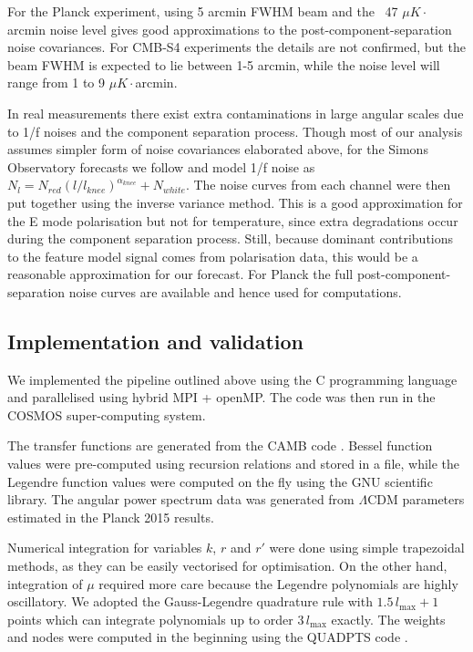 For the Planck experiment, using 5 arcmin FWHM beam and the ~47 $\mu K \cdot $arcmin noise level gives good approximations to the post-component-separation noise covariances. For CMB-S4 experiments the details are not confirmed, but the beam FWHM is expected to lie between 1-5 arcmin, while the noise level will range from 1 to 9 $\mu K \cdot $arcmin. \cite{Abazajian2016}

In real measurements there exist extra contaminations in large angular scales due to 1/f noises and the component separation process. Though most of our analysis assumes simpler form of noise covariances elaborated above, for the Simons Observatory forecasts we follow \cite{TheSimonsObservatoryCollaboration2018} and model 1/f noise as $N_l = N_{red} (l/l_{knee})^{\alpha_{knee}} + N_{white}$. The noise curves from each channel were then put together using the inverse variance method. This is a good approximation for the E mode polarisation but not for temperature, since extra degradations occur during the component separation process. Still, because dominant contributions to the feature model signal comes from polarisation data, this would be a reasonable approximation for our forecast. For Planck the full post-component-separation noise curves are available and hence used for computations. 



\subsection{Implementation and validation}

We implemented the pipeline outlined above using the C programming language and parallelised using hybrid MPI + openMP. The code was then run in the COSMOS super-computing system.

The transfer functions are generated from the CAMB code \cite{Lewis2000}. Bessel function values were pre-computed using recursion relations and stored in a file, while the Legendre function values were computed on the fly using the GNU scientific library. The angular power spectrum data was generated from $\Lambda$CDM parameters estimated in the Planck 2015 results. 

Numerical integration for variables $k$, $r$ and $r'$ were done using simple trapezoidal methods, as they can be easily vectorised for optimisation. On the other hand, integration of $\mu$ required more care because the Legendre polynomials are highly oscillatory. We adopted the Gauss-Legendre quadrature rule with $1.5 \,l_\text{max}+1$ points which can integrate polynomials up to order $3\,l_\text{max}$ exactly. The weights and nodes were computed in the beginning using the QUADPTS code \cite{Hale2013}.

